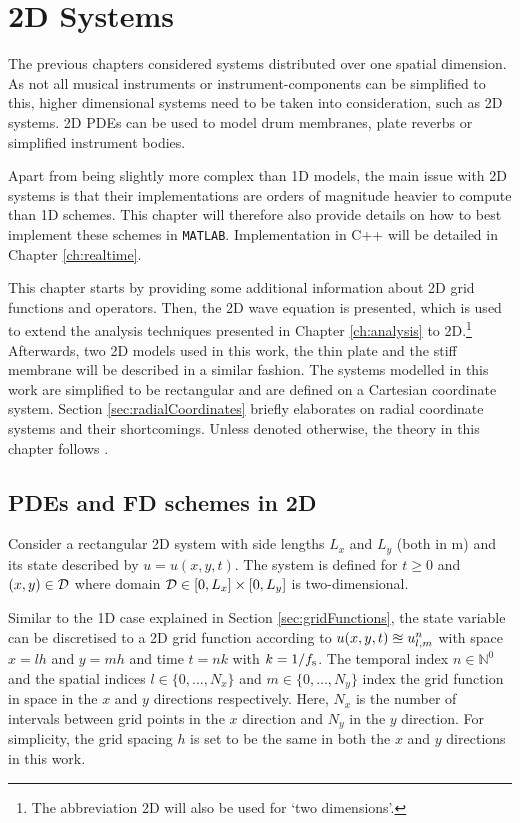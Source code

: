 \chapter{2D Systems}\label{ch:2Dsyst}
The previous chapters considered systems distributed over one spatial dimension. As not all musical instruments or instrument-components can be simplified to this, higher dimensional systems need to be taken into consideration, such as 2D systems. 2D PDEs can be used to model drum membranes, plate reverbs or simplified instrument bodies. 

Apart from being slightly more complex than 1D models, the main issue with 2D systems is that their implementations are orders of magnitude heavier to compute than 1D schemes. This chapter will therefore also provide details on how to best implement these schemes in \texttt{MATLAB}. Implementation in C++ will be detailed in Chapter \ref{ch:realtime}.

This chapter starts by providing some additional information about 2D grid functions and operators. Then, the 2D wave equation is presented, which is used to extend the analysis techniques presented in Chapter \ref{ch:analysis} to 2D.\footnote{The abbreviation 2D will also be used for `two dimensions'.} Afterwards, two 2D models used in this work, the thin plate and the stiff membrane will be described in a similar fashion.
The systems modelled in this work are simplified to be rectangular and are defined on a Cartesian coordinate system. Section \ref{sec:radialCoordinates} briefly elaborates on radial coordinate systems and their shortcomings. 
Unless denoted otherwise, the theory in this chapter follows \cite{theBible}.

\section{PDEs and FD schemes in 2D}\label{sec:2Dintro}
Consider a rectangular 2D system with side lengths $L_x$ and $L_y$ (both in m) and its state described by $u = u(x,y,t)$. The system is defined for $t\geq 0$ and $(x,y) \in \mathcal{D}$ where domain $\mathcal{D} \in [0, L_x]\times [0, L_y]$ is two-dimensional. 

Similar to the 1D case explained in Section \ref{sec:gridFunctions}, the state variable can be discretised to a 2D grid function according to $u(x, y, t) \approxeq u_{l,m}^n$ with space $x = lh$ and $y = mh$ and time $t = nk$ with $k=1/f_\text{s}$. The temporal index $n\in\mathbb{N}^0$  and the spatial indices $l\in \{0, \hdots, N_x\}$ and $m\in \{0, \hdots, N_y\}$ index the grid function in space in the $x$ and $y$ directions respectively. Here, $N_x$ is the number of intervals between grid points in the $x$ direction and $N_y$ in the $y$ direction. For simplicity, the grid spacing $h$ is set to be the same in both the $x$ and $y$ directions in this work.


